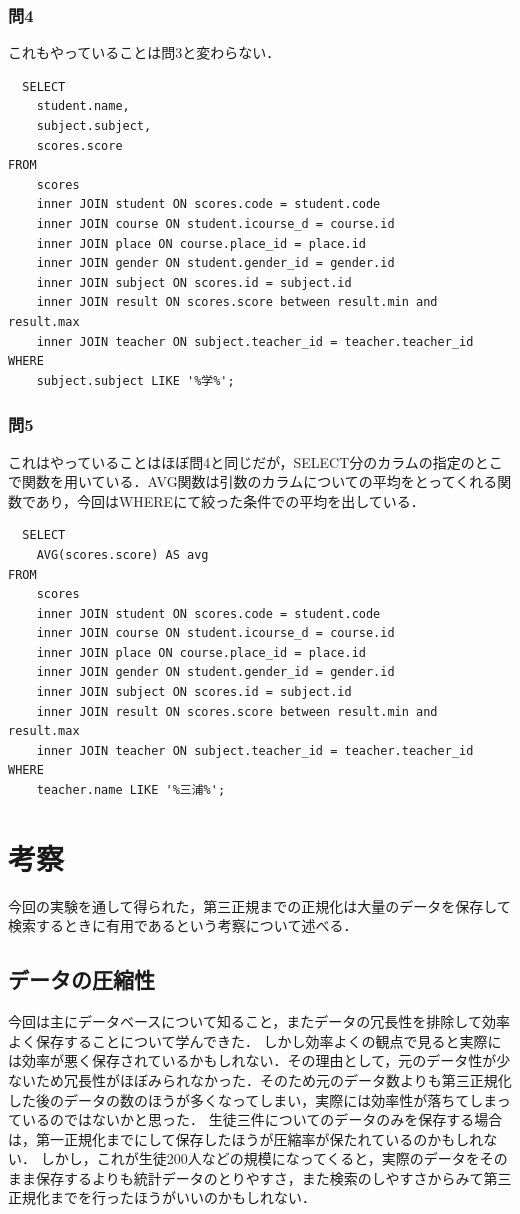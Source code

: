 \documentclass[a4paper,11pt]{ltjsarticle}
\begin{document}
\subsubsection{問4}
これもやっていることは問3と変わらない．
\begin{lstlisting}
  SELECT
    student.name,
    subject.subject,
    scores.score
FROM
    scores
    inner JOIN student ON scores.code = student.code
    inner JOIN course ON student.icourse_d = course.id
    inner JOIN place ON course.place_id = place.id
    inner JOIN gender ON student.gender_id = gender.id
    inner JOIN subject ON scores.id = subject.id
    inner JOIN result ON scores.score between result.min and result.max
    inner JOIN teacher ON subject.teacher_id = teacher.teacher_id
WHERE
    subject.subject LIKE '%学%';
\end{lstlisting}
\subsubsection{問5}
これはやっていることはほぼ問4と同じだが，SELECT分のカラムの指定のとこで関数を用いている．AVG関数は引数のカラムについての平均をとってくれる関数であり，今回はWHEREにて絞った条件での平均を出している．
\begin{lstlisting}
  SELECT
    AVG(scores.score) AS avg
FROM
    scores
    inner JOIN student ON scores.code = student.code
    inner JOIN course ON student.icourse_d = course.id
    inner JOIN place ON course.place_id = place.id
    inner JOIN gender ON student.gender_id = gender.id
    inner JOIN subject ON scores.id = subject.id
    inner JOIN result ON scores.score between result.min and result.max
    inner JOIN teacher ON subject.teacher_id = teacher.teacher_id
WHERE
    teacher.name LIKE '%三浦%';
\end{lstlisting}
\section{考察}
今回の実験を通して得られた，第三正規までの正規化は大量のデータを保存して検索するときに有用であるという考察について述べる．
\subsection{データの圧縮性}
今回は主にデータベースについて知ること，またデータの冗長性を排除して効率よく保存することについて学んできた．
しかし効率よくの観点で見ると実際には効率が悪く保存されているかもしれない．その理由として，元のデータ性が少ないため冗長性がほぼみられなかった．そのため元のデータ数よりも第三正規化した後のデータの数のほうが多くなってしまい，実際には効率性が落ちてしまっているのではないかと思った．
生徒三件についてのデータのみを保存する場合は，第一正規化までにして保存したほうが圧縮率が保たれているのかもしれない．
しかし，これが生徒200人などの規模になってくると，実際のデータをそのまま保存するよりも統計データのとりやすさ，また検索のしやすさからみて第三正規化までを行ったほうがいいのかもしれない．
\end{document}
